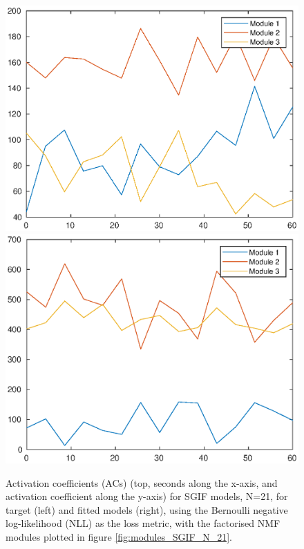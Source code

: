 \documentclass[mphil,deptreport,ianc]{infthesis} %
\begin{document}
\begin{figure}
    \includegraphics[width=0.65\columnwidth]{figures/matlab/NMF/ACs_target_GT_model_microGIF_N_21.eps}
    \includegraphics[width=0.65\columnwidth]{figures/matlab/NMF/ACs_nuovo_synthetic_v2_spikes_mt_microGIF_lfn_bernoulli_nll_euid_01-01_15-56-11-305.eps}
    \caption{Activation coefficients (ACs) (top, seconds along the x-axis, and activation coefficient along the y-axis) for SGIF models, N=21, for target (left) and fitted models (right), using the Bernoulli negative log-likelihood (NLL) as the loss metric, with the factorised NMF modules plotted in figure \ref{fig:modules_SGIF_N_21}.}
    \label{fig:ACs_SGIF_N_21}
\end{figure}
\end{document}
